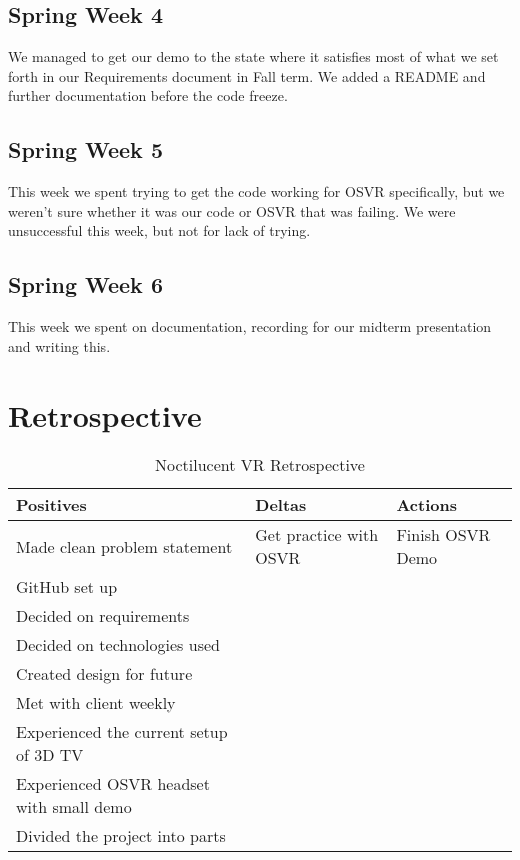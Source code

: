 \documentclass{article}
\begin{document}
\subsection{Spring Week 4}

We managed to get our demo to the state where it satisfies most of what we set forth in our Requirements document in Fall term. 
We added a README and further documentation before the code freeze.

\subsection{Spring Week 5}

This week we spent trying to get the code working for OSVR specifically, but we weren’t sure whether it was our code or OSVR that was failing. 
We were unsuccessful this week, but not for lack of trying.

\subsection{Spring Week 6}

This week we spent on documentation, recording for our midterm presentation and writing this.

\section{Retrospective}

\begin{table}[ht]
\caption{Noctilucent VR Retrospective}
\centering
\begin{tabular}{l l l}
\hline\hline
Positives & Deltas & Actions \\ [0.5ex]
\hline
Made clean problem statement & Get practice with OSVR & Finish OSVR Demo \\
GitHub set up & & \\
Decided on requirements & & \\
Decided on technologies used & & \\
Created design for future &  & \\
Met with client weekly & & \\
Experienced the current setup of 3D TV & & \\
Experienced OSVR headset with small demo & & \\
Divided the project into parts & & \\ [1ex]
\hline
\end{tabular}
\end{table}
\end{document}
